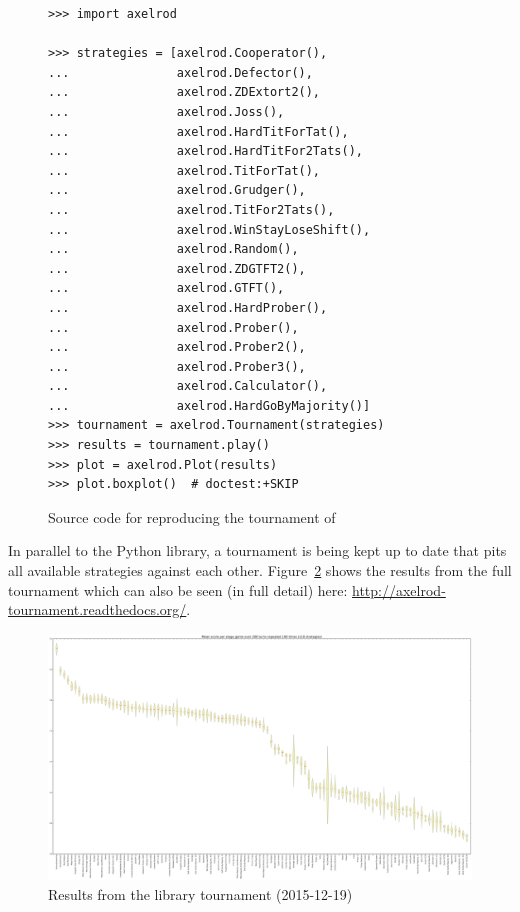 \documentclass{article}
\begin{document}
\begin{figure}[!hbtp]
    \begin{verbatim}
>>> import axelrod

>>> strategies = [axelrod.Cooperator(),
...               axelrod.Defector(),
...               axelrod.ZDExtort2(),
...               axelrod.Joss(),
...               axelrod.HardTitForTat(),
...               axelrod.HardTitFor2Tats(),
...               axelrod.TitForTat(),
...               axelrod.Grudger(),
...               axelrod.TitFor2Tats(),
...               axelrod.WinStayLoseShift(),
...               axelrod.Random(),
...               axelrod.ZDGTFT2(),
...               axelrod.GTFT(),
...               axelrod.HardProber(),
...               axelrod.Prober(),
...               axelrod.Prober2(),
...               axelrod.Prober3(),
...               axelrod.Calculator(),
...               axelrod.HardGoByMajority()]
>>> tournament = axelrod.Tournament(strategies)
>>> results = tournament.play()
>>> plot = axelrod.Plot(results)
>>> plot.boxplot()  # doctest:+SKIP
    \end{verbatim}
    \caption{Source code for reproducing the tournament of \cite{Stewart2012}}
    \label{fig:stewart-code}
\end{figure}

In parallel to the Python library, a tournament is being kept up to date that
pits all available strategies against each other. Figure~\ref{fig:tournament}
shows the results from the full tournament which can also be seen (in full
detail) here: \url{http://axelrod-tournament.readthedocs.org/}.

\begin{figure}[!hbtp]
	\centering
	\includegraphics[width=.9\textwidth]{../img/tournament.pdf}
	\caption{Results from the library tournament (2015-12-19)}
	\label{fig:tournament}
\end{figure}
\end{document}
